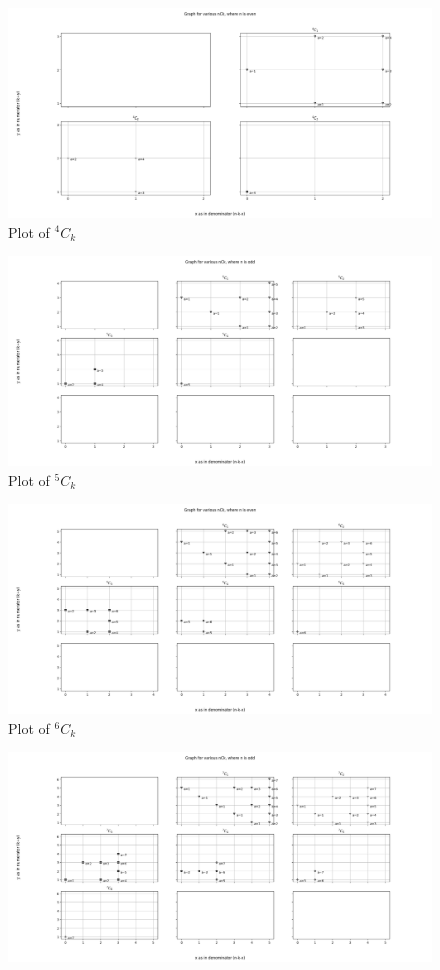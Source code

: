 \documentclass[10pt, twoside]{article}
\newcommand*{\Combination}[2]{{}^{#1}C_{#2}}%
\begin{document}
\begin{appendices}
\begin{figure}[ph!]
	\includegraphics[width=\linewidth]{4Ck.png}
	\caption{Plot of $\Combination{4}{k}$}
	\label{4Ck}
\end{figure}
\begin{figure}[ph!]	
	\includegraphics[width=\linewidth]{5Ck.png}
	\caption{Plot of $\Combination{5}{k}$}
	\label{5Ck}
\end{figure}
\begin{figure}[ph!]	
	\includegraphics[width=\linewidth]{6Ck.png}
	\caption{Plot of $\Combination{6}{k}$}
	\label{6Ck}
\end{figure}
\begin{figure}[ph!]	
	\includegraphics[width=\linewidth]{7Ck.png}

\end{figure}
\end{appendices}
\end{document}
